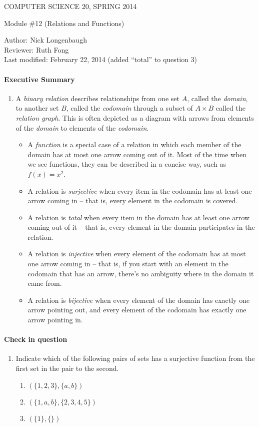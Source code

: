 \documentclass[12pt]{article}
\begin{document}
\begin{center}
\large
COMPUTER SCIENCE 20, SPRING 2014 \\
\medskip

Module \#12 (Relations and Functions)
\end{center}
Author: Nick Longenbaugh\\
Reviewer: Ruth Fong\\
Last modified: February 22, 2014 (added ``total'' to question 3)
\medskip


\paragraph*{Executive Summary}
\begin{enumerate}
\item A {\em binary relation} describes relationships from one set $A$, called the {\em domain}, to another set $B$, called the {\em codomain} through a subset of $A \times B$ called the {\em relation graph}.  This is often depicted as a diagram with arrows from elements of the {\em domain} to elements of the {\em codomain}.
\begin{itemize}
\item A {\em function} is a special case of a relation in which each member of the domain has at most one arrow coming out of it.  Most of the time when we see functions, they can be described in a concise way, such as $f(x) = x^2$.
\item A relation is {\em surjective} when every item in the codomain has at least one arrow coming in -- that is, every element in the codomain is covered.
\item A relation is {\em total} when every item in the domain has at least one arrow coming out of it -- that is, every element in the domain participates in the relation.
\item A relation is {\em injective} when every element of the codomain has at most one arrow coming in -- that is, if you start with an element in the codomain that has an arrow, there's no ambiguity where in the domain it came from.
\item A relation is {\em bijective} when every element of the domain has exactly one arrow pointing out, and every element of the codomain has exactly one arrow pointing in.
\end{itemize}
\end{enumerate}


\paragraph*{Check in question}
\begin{enumerate}
\item Indicate which of the following pairs of sets has a surjective function from the first set in the pair to the second.
\begin{enumerate}
\item $(\{1,2,3\}, \{a,b\})$
\item $(\{1,a,b\}, \{2,3,4,5\})$
\item $(\{1\}, \{ \})$
\end{enumerate}
\end{enumerate}
\end{document}

